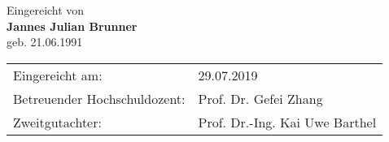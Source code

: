 \documentclass[12pt,a4paper,bibtotoc,pointlessnumbers]{scrartcl}
\begin{document}
\begin{titlepage}
\begin{center}
			\vspace{1.5cm}
			
			{\doublespacing Eingereicht von\\
			{\Large \bf Jannes Julian Brunner}\\ geb. 21.06.1991}
			
		
			\large
			\begin{table}[b]
				\begin{center}
					\begin{tabular}{ll}
					Eingereicht am:& 29.07.2019\\
					Betreuender Hochschuldozent:& Prof. Dr. Gefei Zhang\\
					Zweitgutachter: & Prof. Dr.-Ing. Kai Uwe Barthel\\
					\end{tabular}
				\end{center}
			\end{table} 
		\end{center}
		\vspace{0.6cm}
\end{titlepage}

\newpage





\setcounter{page}{10}


\newpage

\cfoot{\pagemark}
\tableofcontents 
\newpage







\pagestyle{fancy}
\fancyhf{}
\renewcommand{\headrulewidth}{0.4pt} %
\renewcommand{\sectionmark}[1]{%
	\markboth{\thesection.\ #1}{}} %


\fancyhead[L]{\textsl{\small 
		\rightmark}}
\fancyhead[R]{\textsl{\small \thepage}}
\end{document}
